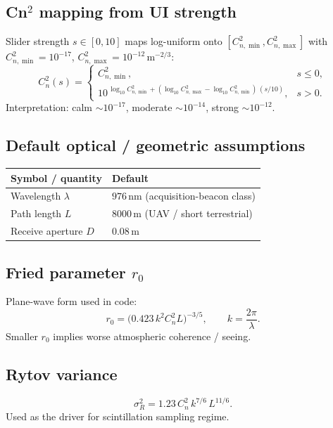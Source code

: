 \documentclass[11pt,a4paper]{article}
\begin{document}
\subsection{Cn$^2$ mapping from UI strength}
Slider strength $s\in[0,10]$ maps log-uniform onto $[C_{n,\min}^2, C_{n,\max}^2]$ with
$C_{n,\min}^2=10^{-17}$, $C_{n,\max}^2=10^{-12}$\,m$^{-2/3}$:
\begin{equation}
C_n^2(s)
=
\begin{cases}
C_{n,\min}^2, & s\le 0,\\[0.3em]
10^{\,\log_{10} C_{n,\min}^2
+ (\log_{10} C_{n,\max}^2-\log_{10} C_{n,\min}^2)\,(s/10)}, & s>0.
\end{cases}
\end{equation}
Interpretation: calm $\sim 10^{-17}$, moderate $\sim 10^{-14}$, strong $\sim 10^{-12}$.

\subsection{Default optical / geometric assumptions}
\begin{center}
\begin{tabular}{@{}ll@{}}
\toprule
Symbol / quantity & Default \\
\midrule
Wavelength $\lambda$ & $976\,\mathrm{nm}$ (acquisition-beacon class) \\
Path length $L$ & $8000\,\mathrm{m}$ (UAV / short terrestrial) \\
Receive aperture $D$ & $0.08\,\mathrm{m}$ \\
\bottomrule
\end{tabular}
\end{center}

\subsection{Fried parameter $r_0$}
Plane-wave form used in code:
\begin{equation}
r_0
=
\bigl(0.423\, k^2 C_n^2 L\bigr)^{-3/5},
\qquad
k=\frac{2\pi}{\lambda}.
\end{equation}
Smaller $r_0$ implies worse atmospheric coherence / seeing.

\subsection{Rytov variance}
\begin{equation}
\sigma_R^2
=
1.23\, C_n^2\, k^{7/6}\, L^{11/6}.
\end{equation}
Used as the driver for scintillation sampling regime.
\end{document}
